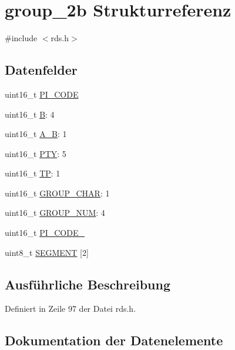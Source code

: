 \hypertarget{structgroup__2b}{}\section{group\+\_\+2b Strukturreferenz}
\label{structgroup__2b}


{\ttfamily \#include $<$rds.\+h$>$}

\subsection*{Datenfelder}
\begin{DoxyCompactItemize}
\item 
uint16\+\_\+t \hyperlink{structgroup__2b_a5cd9b1f6413028425796c1129aa8fd87}{P\+I\+\_\+\+C\+O\+D\+E}
\item 
uint16\+\_\+t \hyperlink{structgroup__2b_ae783bd90764c8455228772c025c064e4}{B}\+: 4
\item 
uint16\+\_\+t \hyperlink{structgroup__2b_a226eb9a4ec1152d0c92ce7324916ad56}{A\+\_\+\+B}\+: 1
\item 
uint16\+\_\+t \hyperlink{structgroup__2b_a0474967478fbbc2c71b800d2e0132d45}{P\+T\+Y}\+: 5
\item 
uint16\+\_\+t \hyperlink{structgroup__2b_ab9e634c63b0d95a96716d5f6d7f06d72}{T\+P}\+: 1
\item 
uint16\+\_\+t \hyperlink{structgroup__2b_a66d4119990dc4c3e040a43885e9bb953}{G\+R\+O\+U\+P\+\_\+\+C\+H\+A\+R}\+: 1
\item 
uint16\+\_\+t \hyperlink{structgroup__2b_a9f692e9f76ee88348d426bcd4e9bc70b}{G\+R\+O\+U\+P\+\_\+\+N\+U\+M}\+: 4
\item 
uint16\+\_\+t \hyperlink{structgroup__2b_ae86fed9d07832a5c3cc36d5aaa064bcb}{P\+I\+\_\+\+C\+O\+D\+E\+\_}
\item 
uint8\+\_\+t \hyperlink{structgroup__2b_ad4b043906241d98e6b480a31f1438352}{S\+E\+G\+M\+E\+N\+T} \mbox{[}2\mbox{]}
\end{DoxyCompactItemize}


\subsection{Ausführliche Beschreibung}


Definiert in Zeile 97 der Datei rds.\+h.



\subsection{Dokumentation der Datenelemente}
\hypertarget{structgroup__2b_a226eb9a4ec1152d0c92ce7324916ad56}{}
